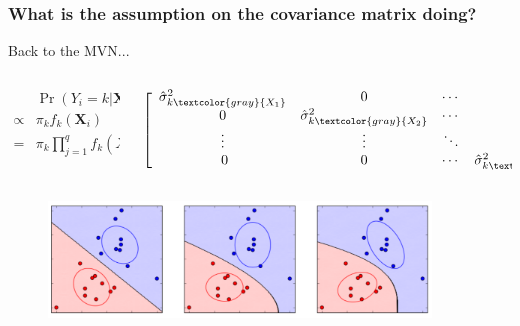 \documentclass[xcolor={dvipsnames}]{beamer}
\begin{document}
\frame
{
 \frametitle{What is the assumption on the covariance matrix doing?}

Back to the MVN... 
\vspace{-1em}
\begin{columns}
\begin{column}{.36\textwidth}

\begin{align*}
{}& \Pr(Y_i=k|  {\boldsymbol X}_i)\\
 \propto {}& \pi_{k} f_{k}({\boldsymbol X}_i)\\
 = {}& \pi_{k}\prod_{j=1}^q f_k(X_{ji})
\end{align*} 

\end{column}
\begin{column}{.5\textwidth}


$$ \left[\begin{array}{cccc}\hat \sigma^2_{k\textcolor{gray}{X_1}}&\;\;\;0\;\;\;& \cdots & \;\;\;\;0\;\;\;\\ 
0&\hat \sigma^2_{k\textcolor{gray}{X_2}}&  \cdots & 0\\
\vdots &\vdots&  \ddots & \vdots\\
\;\;\;\;0\;\;\; & 0 &   \cdots & \hat \sigma^2_{k\textcolor{gray}{X_q}}  \\ \end{array}\right] $$

\end{column}
\end{columns}


\begin{figure}
\centering
 \includegraphics[width=4in]{stuffs/linear_discriminants.png}
 
\tiny
{}

 

\end{figure}
}
\end{document}
